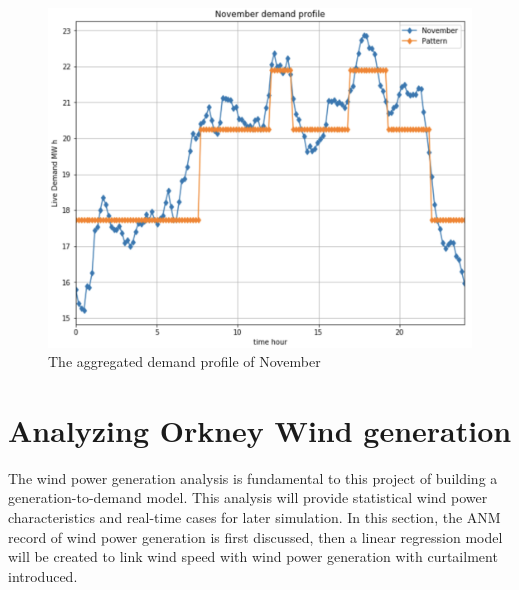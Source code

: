\documentclass[12pt,a4paper]{report}
\begin{document}
                    \begin{figure}[ht]
                        \centerline{\includegraphics[scale=1]{november_demand_profile}}
                        \caption{The aggregated demand profile of November}
                        \label{plot_november_demand_profile}
                    \end{figure}
                
        \section{Analyzing Orkney Wind generation}
        The wind power generation analysis is fundamental to this project of building a generation-to-demand model. This analysis will provide statistical wind power characteristics and real-time cases for later simulation. In this section, the ANM record of wind power generation is first discussed, then a linear regression model will be created to link wind speed with wind power generation with curtailment introduced.
\end{document}
